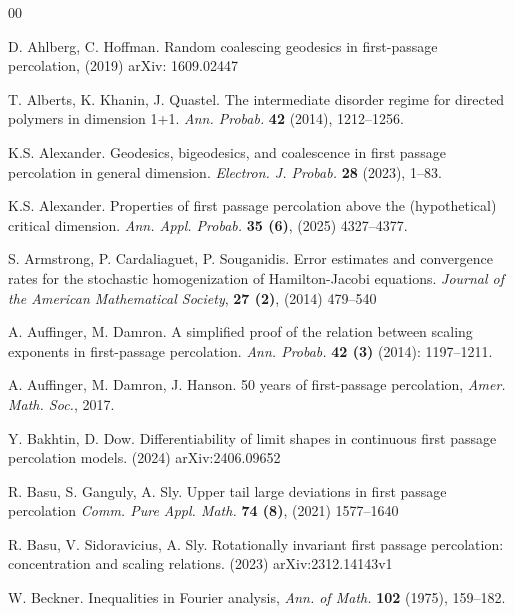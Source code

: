 \documentclass[reqno]{amsart}
\begin{document}
\begin{thebibliography}{00}


D. Ahlberg, C. Hoffman. Random coalescing geodesics in first-passage percolation,
(2019) arXiv: 1609.02447

 T. Alberts, K. Khanin, J. Quastel. The intermediate disorder regime for directed polymers in dimension 1+1.
{\em Ann. Probab.} {\bf 42} (2014), 1212--1256.

 K.S. Alexander. Geodesics, bigeodesics, and coalescence in first
passage percolation in general dimension. {\em Electron. J. Probab.} {\bf 28} (2023), 1--83.



 K.S. Alexander. Properties of first passage percolation above the (hypothetical) critical dimension.
{\em Ann. Appl. Probab.} {\bf 35 (6)}, (2025) 4327--4377.

 S. Armstrong, P. Cardaliaguet, P. Souganidis. Error estimates and convergence rates for the stochastic homogenization of Hamilton-Jacobi equations.
{\em Journal of the American Mathematical Society}, {\bf 27 (2)}, (2014) 479--540


 A. Auffinger, M. Damron. A simplified proof of the relation between scaling exponents in first-passage percolation. 
{\em Ann. Probab.} {\bf 42 (3) } (2014): 1197--1211.

 A. Auffinger, M. Damron, J. Hanson.
  50 years of first-passage percolation,
{\em Amer. Math. Soc.}, 2017.

 Y. Bakhtin, D. Dow. Differentiability of limit shapes in continuous first passage percolation models. 
(2024) arXiv:2406.09652


  R. Basu, S. Ganguly, A. Sly. Upper tail large deviations in first passage percolation
{\em 
Comm. Pure Appl. Math.} {\bf 74 (8)}, (2021) 1577--1640

 R. Basu, V. Sidoravicius, A. Sly. Rotationally invariant first passage percolation: concentration and scaling relations. 
(2023) arXiv:2312.14143v1


 W. Beckner. Inequalities in Fourier analysis, {\em Ann. of Math.} {\bf 102} (1975), 159--182.


\end{thebibliography}
\end{document}

